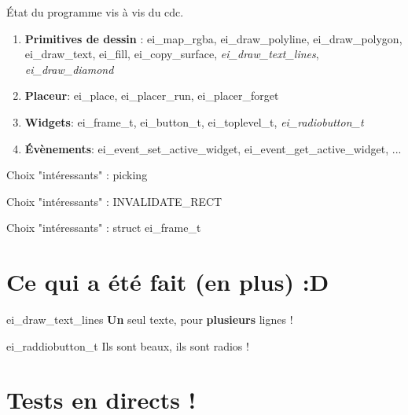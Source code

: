\documentclass[10pt]{beamer}
\begin{document}
\begin{frame}{État du programme vis à vis du cdc.}

    \begin{enumerate}
        \item \textbf{Primitives de dessin} : ei\_map\_rgba, ei\_draw\_polyline, ei\_draw\_polygon, ei\_draw\_text, ei\_fill, ei\_copy\_surface, \emph{ei\_draw\_text\_lines}, \emph{ei\_draw\_diamond}
        \item \textbf{Placeur}: ei\_place, ei\_placer\_run, ei\_placer\_forget
        \item \textbf{Widgets}: ei\_frame\_t, ei\_button\_t, ei\_toplevel\_t, \emph{ei\_radiobutton\_t}
        \item \textbf{Évènements}: ei\_event\_set\_active\_widget, ei\_event\_get\_active\_widget, ...
    \end{enumerate}

\end{frame}
\lstset{
basicstyle=\footnotesize, frame=tb,
xleftmargin=.2\textwidth, xrightmargin=.2\textwidth
}
\begin{frame}{Choix "intéressants" : picking}

\end{frame}

\begin{frame}{Choix "intéressants" : INVALIDATE\_RECT}

\end{frame}

\begin{frame}{Choix "intéressants" : struct ei\_frame\_t}
    \begin{center}
        
    \end{center}
\end{frame}

\section{Ce qui a été fait (en plus) :D}

\begin{frame}{ei\_draw\_text\_lines}
    \textbf{Un} seul texte, pour \textbf{plusieurs} lignes !
\end{frame}


\begin{frame}{ei\_raddiobutton\_t}
    Ils sont beaux, ils sont radios !
\end{frame}

\section{Tests en directs !}

\end{document}
